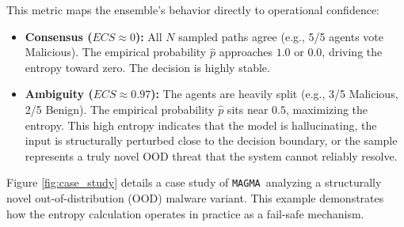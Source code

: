 \documentclass[pdflatex,sn-mathphys-num]{sn-jnl}
\newcommand{\sysname}{\texttt{MAGMA}~}
\begin{document}
This metric maps the ensemble's behavior directly to operational confidence:
\begin{itemize}
    \item \textbf{Consensus ($ECS \approx 0$):} All $N$ sampled paths agree (e.g., 5/5 agents vote Malicious). The empirical probability $\hat{p}$ approaches $1.0$ or $0.0$, driving the entropy toward zero. The decision is highly stable.
    \item \textbf{Ambiguity ($ECS \approx 0.97$):} The agents are heavily split (e.g., 3/5 Malicious, 2/5 Benign). The empirical probability $\hat{p}$ sits near $0.5$, maximizing the entropy. This high entropy indicates that the model is hallucinating, the input is structurally perturbed close to the decision boundary, or the sample represents a truly novel OOD threat that the system cannot reliably resolve.
\end{itemize}

Figure \ref{fig:case_study} details a case study of \sysname analyzing a structurally novel out-of-distribution (OOD) malware variant. This example demonstrates how the entropy calculation operates in practice as a fail-safe mechanism.
\end{document}
